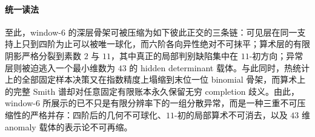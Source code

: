 \paragraph{统一读法}
至此，window-\(6\) 的深层骨架可被压缩为如下彼此正交的三条链：可见层在同一支持上只到四阶为止可以被唯一球化，而六阶各向异性绝对不可抹平；算术层的有限阴影严格分裂到素数 \(2\) 与 \(11\)，其中真正的局部判别缺陷集中在 \(11\)-初方向；异常层则被迫逃入一个最小维数为 \(43\) 的 hidden determinant 载体。与此同时，热统计上的全部固定样本决策又在指数精度上塌缩到末位一位 binomial 骨架，而算术上的完整 Smith 谱却对任意固定有限账本永久保留无穷 completion 歧义。由此，window-\(6\) 所展示的已不只是有限分辨率下的一组分散异常，而是一种三重不可压缩性的严格并存：四阶后的几何不可球化、\(11\)-初的局部算术不可消去，以及 \(43\) 维 anomaly 载体的表示论不可再缩。

\endinput
